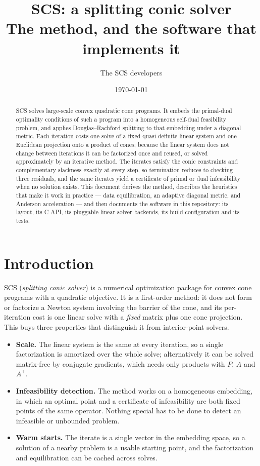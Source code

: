 \documentclass[11pt,a4paper]{article}
\title{\textbf{SCS: a splitting conic solver}\\[0.4em]
       \large The method, and the software that implements it}
\author{The SCS developers}
\date{\today}
\newcommand{\tr}{^\top}
\theoremstyle{plain}
\begin{document}
\maketitle

\begin{abstract}
SCS solves large-scale convex quadratic cone programs. It embeds the primal-dual
optimality conditions of such a program into a homogeneous self-dual feasibility
problem, and applies Douglas--Rachford splitting to that embedding under a
diagonal metric. Each iteration costs one solve of a fixed quasi-definite linear
system and one Euclidean projection onto a product of cones; because the linear
system does not change between iterations it can be factorized once and reused,
or solved approximately by an iterative method. The iterates satisfy the conic
constraints and complementary slackness exactly at every step, so termination
reduces to checking three residuals, and the same iterates yield a certificate
of primal or dual infeasibility when no solution exists. This document derives
the method, describes the heuristics that make it work in practice --- data
equilibration, an adaptive diagonal metric, and Anderson acceleration --- and
then documents the software in this repository: its layout, its C API, its
pluggable linear-solver backends, its build configuration and its tests.
\end{abstract}

\tableofcontents

\section{Introduction}

SCS (\emph{splitting conic solver}) is a numerical optimization package for
convex cone programs with a quadratic objective. It is a first-order method: it
does not form or factorize a Newton system involving the barrier of the cone,
and its per-iteration cost is one linear solve with a \emph{fixed} matrix plus
one cone projection. This buys three properties that distinguish it from
interior-point solvers.

\begin{itemize}
\item \textbf{Scale.} The linear system is the same at every iteration, so a
  single factorization is amortized over the whole solve; alternatively it can
  be solved matrix-free by conjugate gradients, which needs only products with
  $P$, $A$ and $A\tr$.
\item \textbf{Infeasibility detection.} The method works on a homogeneous
  embedding, in which an optimal point and a certificate of infeasibility are
  both fixed points of the same operator. Nothing special has to be done to
  detect an infeasible or unbounded problem.
\item \textbf{Warm starts.} The iterate is a single vector in the embedding
  space, so a solution of a nearby problem is a usable starting point, and the
  factorization and equilibration can be cached across solves.
\end{itemize}
\end{document}
